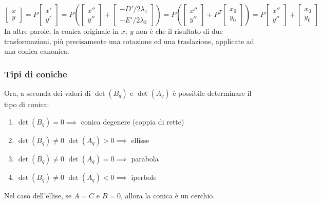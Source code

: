 \documentclass{article}
\begin{document}
        \[
            \begin{bmatrix} x \\ y \end{bmatrix} = P \begin{bmatrix} x' \\ y' \end{bmatrix} = P \left( \begin{bmatrix} x'' \\ y'' \end{bmatrix} + \begin{bmatrix} - D' / 2 \lambda_1 \\ - E' / 2 \lambda_2 \end{bmatrix} \right) = P \left( \begin{bmatrix} x'' \\ y'' \end{bmatrix} + P^{T} \begin{bmatrix} x_0 \\ y_0 \end{bmatrix} \right) = P \begin{bmatrix} x'' \\ y'' \end{bmatrix} + \begin{bmatrix} x_0 \\ y_0 \end{bmatrix}
        \]
        In altre parole, la conica originale in $x, \: y$ non è che il risultato di due trasformazioni, più precisamente una rotazione ed una traslazione, applicate ad una conica canonica. 

    \vspace{10pt}
    \subsubsection{Tipi di coniche} \label{subsubsec:quadformconictypes}
        Ora, a seconda dei valori di $\det(B_q)$ e $\det(A_q)$ è possibile determinare il tipo di conica:
        \begin{enumerate}[label=(\arabic*)]
            \item  $\det(B_q) = 0 \implies$ conica degenere (coppia di rette)
            \item $\det(B_q) \neq 0$  $\det(A_q) > 0 \implies$  ellisse 
            \item $\det(B_q) \neq 0$  $\det(A_q) = 0 \implies$  parabola
            \item $\det(B_q) \neq 0$  $\det(A_q) < 0 \implies$  iperbole
        \end{enumerate}
        Nel caso dell'ellise, se $A = C$ e $B = 0$, allora la conica è un cerchio.
    
\end{document}

